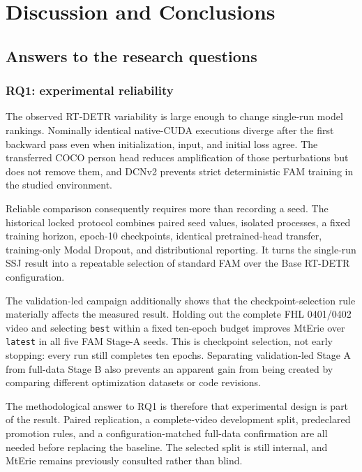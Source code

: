 \chapter{Discussion and Conclusions}
\label{chap:discussion}

\section{Answers to the research questions}

\subsection{RQ1: experimental reliability}

The observed RT-DETR variability is large enough to change single-run model
rankings. Nominally identical native-CUDA executions diverge after the first
backward pass even when initialization, input, and initial loss agree. The
transferred COCO person head reduces amplification of those perturbations but
does not remove them, and DCNv2 prevents strict deterministic FAM training in
the studied environment.

Reliable comparison consequently requires more than recording a seed. The
historical locked protocol combines paired seed values, isolated processes, a
fixed training horizon, epoch-10 checkpoints, identical pretrained-head
transfer, training-only Modal Dropout, and distributional reporting. It turns
the single-run SSJ result into a repeatable selection of standard FAM over the
Base RT-DETR configuration.

The validation-led campaign additionally shows that the checkpoint-selection rule
materially affects the measured result. Holding out the complete FHL
0401/0402 video and selecting \texttt{best} within a fixed ten-epoch budget
improves MtErie over \texttt{latest} in all five FAM Stage-A seeds. This is
checkpoint selection, not early stopping: every run still completes ten
epochs. Separating validation-led Stage A from full-data Stage B also prevents
an apparent gain from being created by comparing different optimization
datasets or code revisions.

The methodological answer to RQ1 is therefore that experimental design is part
of the result. Paired replication, a complete-video development split,
predeclared promotion rules, and a configuration-matched full-data confirmation
are all needed before replacing the baseline. The selected split is still
internal, and MtErie remains previously consulted rather than blind.

